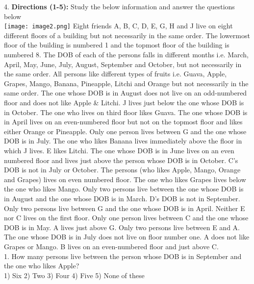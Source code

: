\documentclass[
]{article}
\begin{document}
4. \textbf{Directions (1-5):} Study the below information and answer the questions below\\
\texttt{[image: image2.png]}
Eight friends A, B, C, D, E, G, H and J live on eight different floors of a building but not
necessarily in the same order. The lowermost floor of the building is numbered 1 and the
topmost floor of the building is numbered 8. The DOB of each of the persons falls in
different months i.e. March, April, May, June, July, August, September and October, but not
necessarily in the same order. All persons like different types of fruits i.e. Guava, Apple,
Grapes, Mango, Banana, Pineapple, Litchi and Orange but not necessarily in the same order.
The one whose DOB is in August does not live on an odd-numbered floor and does not like
Apple \& Litchi. J lives just below the one whose DOB is in October. The one who lives on
third floor likes Guava. The one whose DOB is in April lives on an even-numbered floor but
not on the topmost floor and likes either Orange or Pineapple. Only one person lives
between G and the one whose DOB is in July. The one who likes Banana lives immediately
above the floor in which J lives. E likes Litchi. The one whose DOB is in June lives on an
even numbered floor and lives just above the person whose DOB is in October. C’s DOB is
not in July or October. The persons (who likes Apple, Mango, Orange and Grapes) lives on
even numbered floor. The one who likes Grapes lives below the one who likes Mango. Only
two persons live between the one whose DOB is in August and the one whose DOB is in
March. D’s DOB is not in September. Only two persons live between G and the one whose
DOB is in April. Neither E nor C lives on the first floor. Only one person lives between C
and the one whose DOB is in May. A lives just above G. Only two persons live between E
and A. The one whose DOB is in July does not live on floor number one. A does not like
Grapes or Mango. B lives on an even-numbered floor and just above C.\\

1. How many persons live between the person whose DOB is in September and the one
who likes Apple?\\
1) Six \hspace{2mm}2) Two \hspace{2mm}3) Four \hspace{2mm}4) Five \hspace{2mm}5) None of these\\
\end{document}
